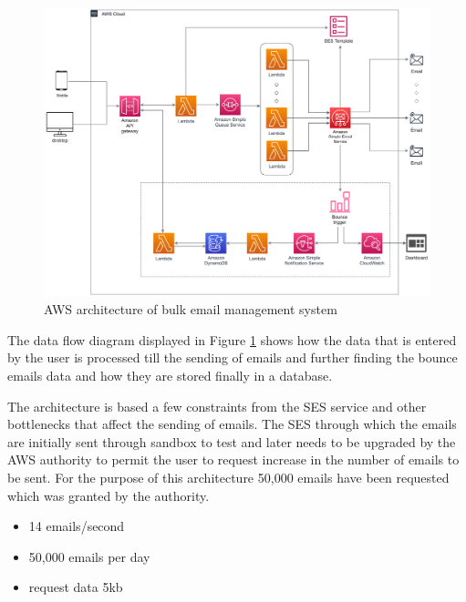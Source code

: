 \begin{figure}[H]
            \centering
            \includegraphics[width=160mm]{figures/architect.png}
            \caption{AWS architecture of bulk email management system}
	    \label{fig:architect}
\end{figure}


The data flow diagram displayed in Figure \ref{fig:architect} shows how the data that is entered by the user is processed till the sending of emails and further finding the bounce emails data and how they are stored finally in a database.

The architecture is based a few constraints from the SES service and other bottlenecks that affect the sending of emails. The SES through which the emails are initially sent through sandbox to test and later needs to be upgraded by the AWS authority to permit the user to request increase in the number of emails to be sent. For the purpose of this architecture 50,000 emails have been requested which was granted by the authority.
\begin{itemize}
	\item 14 emails/second
	\item 50,000 emails per day
	\item request data 5kb
\end{itemize}

